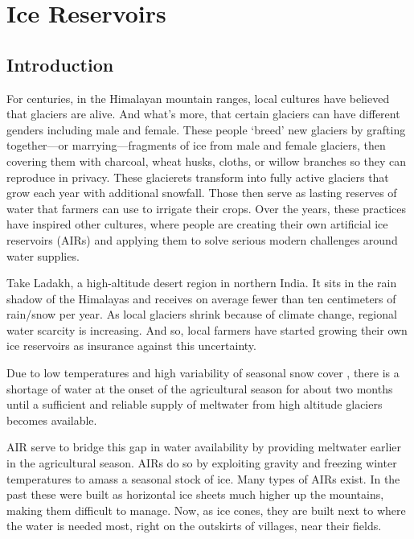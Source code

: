 \chapter{Ice Reservoirs}

\section{Introduction}

For centuries, in the Himalayan mountain ranges, local cultures have believed that glaciers are alive. And
what’s more, that certain glaciers can have different genders including male and female. These people ‘breed’
new glaciers by grafting together—or marrying—fragments of ice from male and female glaciers, then covering them
with charcoal, wheat husks, cloths, or willow branches so they can reproduce in privacy. These glacierets
transform into fully active glaciers that grow each year with additional snowfall. Those then serve as lasting
reserves of water that farmers can use to irrigate their crops. Over the years, these practices have inspired
other cultures, where people are creating their own artificial ice reservoirs (AIRs) and applying them to solve
serious modern challenges around water supplies.

Take Ladakh, a high-altitude desert region in northern India. It sits in the rain shadow of the Himalayas and
receives on average fewer than ten centimeters of rain/snow per year. As local glaciers shrink because of
climate change, regional water scarcity is increasing. And so, local farmers have started growing their own ice
reservoirs as insurance against this uncertainty. 

Due to low temperatures and high variability of seasonal snow cover
\citep{mukhopadhyayReevaluationSnowmeltGlacial2015}, there is a shortage of water at the onset of the
agricultural season for about two months until a sufficient and reliable supply of meltwater from high altitude
glaciers becomes available. 

AIR serve to bridge this gap in water availability by providing meltwater earlier in the agricultural season.
AIRs do so by exploiting gravity and freezing winter temperatures to amass a seasonal stock of ice. Many types
of AIRs exist. In the past these were built as horizontal ice sheets much higher up the mountains, making them
difficult to manage. Now, as ice cones, they are built next to where the water is needed most, right on the
outskirts of villages, near their fields.

